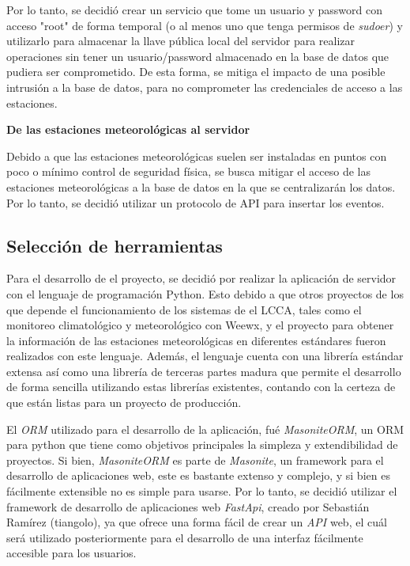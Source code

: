 Por lo tanto, se decidió crear un servicio que tome un usuario y password con acceso "root" de forma temporal (o al menos uno que tenga permisos de \emph{sudoer}) y utilizarlo para almacenar la llave pública local del servidor para realizar operaciones sin tener un usuario/password almacenado en la base de datos que pudiera ser comprometido. De esta forma, se mitiga el impacto de una posible intrusión a la base de datos, para no comprometer las credenciales de acceso a las estaciones.

\textbf{De las estaciones meteorológicas al servidor}

Debido a que las estaciones meteorológicas suelen ser instaladas en puntos con poco o mínimo control de seguridad física, se busca mitigar el acceso de las estaciones meteorológicas a la base de datos en la que se centralizarán los datos. Por lo tanto, se decidió utilizar un protocolo de API para insertar los eventos.


\subsection{Selección de herramientas}

Para el desarrollo de el proyecto, se decidió por realizar la aplicación de servidor con el lenguaje de programación Python. Esto debido a que otros proyectos de los que depende el funcionamiento de los sistemas de el LCCA, tales como el monitoreo climatológico y meteorológico con Weewx, y el proyecto para obtener la información de las estaciones meteorológicas en diferentes estándares fueron realizados con este lenguaje. Además, el lenguaje cuenta con una librería estándar extensa así como una librería de terceras partes madura que permite el desarrollo de forma sencilla utilizando estas librerías existentes, contando con la certeza de que están listas para un proyecto de producción.


El \textit{ORM} utilizado para el desarrollo de la aplicación, fué \textit{MasoniteORM}, un ORM para python que tiene como objetivos principales la simpleza y extendibilidad de proyectos. Si bien, \textit{MasoniteORM} es parte de \textit{Masonite}, un framework para el desarrollo de aplicaciones web, este es bastante extenso y complejo, y si bien es fácilmente extensible no es simple para usarse. Por lo tanto, se decidió utilizar el framework de desarrollo de aplicaciones web \textit{FastApi}, creado por Sebastián Ramírez (tiangolo), ya que ofrece una forma fácil de crear un \textit{API} web, el cuál será utilizado posteriormente para el desarrollo de una interfaz fácilmente accesible para los usuarios.

